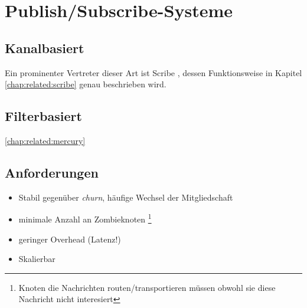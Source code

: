 \section{Publish/Subscribe-Systeme}
\label{chap:grundlagen:pubsub}

\subsection{Kanalbasiert}
\label{chap:grundlagen:pubsub:kanalbasiert}
Ein prominenter Vertreter dieser Art ist Scribe \cite{citeulike:345316}, dessen Funktionsweise in Kapitel \ref{chap:related:scribe} genau beschrieben wird.

\subsection{Filterbasiert}
\label{chap:grundlagen:pubsub:filterbased}
\cite{citeulike:854573} %
\ref{chap:related:mercury}

\cite{citeulike:6674153} %

\cite{citeulike:4291} %


\subsection{Anforderungen}
\begin{itemize}
\item Stabil gegenüber \emph{churn}, häufige Wechsel der Mitgliedschaft
\item minimale Anzahl an Zombieknoten \footnote{Knoten die Nachrichten routen/transportieren müssen obwohl sie diese Nachricht nicht interesiert}
\item geringer Overhead (Latenz!)
\item Skalierbar
\end{itemize}
